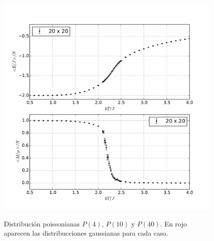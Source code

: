 \documentclass[a4paper,12pt]{article}
\begin{document}
\begin{figure}[H]
    \begin{center}
      \includegraphics[scale=0.6]{val_medios.pdf} \\
      \caption{Distribución poissonianas $P(4)$, $P(10)$ y $P(40)$. En rojo 
      aparecen las distribucciones gaussianas para cada 
      caso.}\label{fig:val_medios}
    \end{center}
\end{figure}
\end{document}
